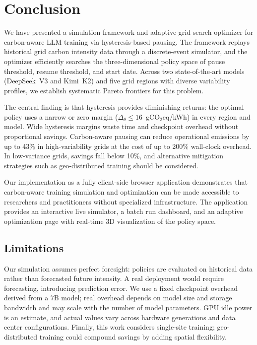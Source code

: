 
\chapter{Conclusion}
\label{sec:conclusion}

We have presented a simulation framework and adaptive grid-search optimizer
for carbon-aware LLM training via hysteresis-based pausing.  The framework
replays historical grid carbon intensity data through a discrete-event
simulator, and the optimizer efficiently searches the three-dimensional policy
space of pause threshold, resume threshold, and start date.  Across two
state-of-the-art models (DeepSeek~V3 and Kimi~K2) and five grid regions with
diverse variability profiles, we establish systematic Pareto frontiers for
this problem.

The central finding is that hysteresis provides diminishing returns: the
optimal policy uses a narrow or zero margin ($\Delta_\theta \leq
16$~gCO$_2$eq/kWh) in every region and model.  Wide hysteresis margins waste
time and checkpoint overhead without proportional savings.  Carbon-aware
pausing can reduce operational emissions by up to 43\% in high-variability
grids at the cost of up to 200\% wall-clock overhead.  In low-variance grids,
savings fall below 10\%, and alternative mitigation strategies such as
geo-distributed training should be considered.

Our implementation as a fully client-side browser application demonstrates
that carbon-aware training simulation and optimization can be made accessible
to researchers and practitioners without specialized infrastructure.  The
application provides an interactive live simulator, a batch run dashboard,
and an adaptive optimization page with real-time 3D visualization of the
policy space.

\section{Limitations}

Our simulation assumes perfect foresight: policies are evaluated on historical
data rather than forecasted future intensity.  A real deployment would require
forecasting, introducing prediction error.  We use a fixed checkpoint overhead
derived from a 7B model; real overhead depends on model size and storage
bandwidth and may scale with the number of model parameters.  GPU idle power
is an estimate, and actual values vary across hardware generations and data
center configurations.  Finally, this work considers single-site training;
geo-distributed training could compound savings by adding spatial flexibility.

